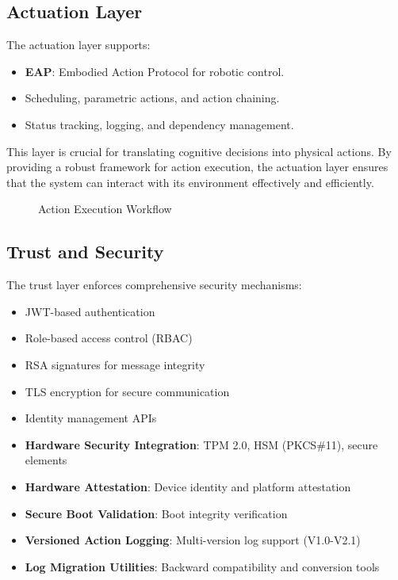 \documentclass[12pt]{article}
\begin{document}
\subsection{Actuation Layer}
The actuation layer supports:
\begin{itemize}
  \item \textbf{EAP}: Embodied Action Protocol for robotic control.
  \item Scheduling, parametric actions, and action chaining.
  \item Status tracking, logging, and dependency management.
\end{itemize}

This layer is crucial for translating cognitive decisions into physical actions. By providing a robust framework for action execution, the actuation layer ensures that the system can interact with its environment effectively and efficiently.

\begin{figure}[H]
\centering
{}
\caption{Action Execution Workflow}
\end{figure}

\subsection{Trust and Security}
The trust layer enforces comprehensive security mechanisms:
\begin{itemize}
  \item JWT-based authentication
  \item Role-based access control (RBAC)
  \item RSA signatures for message integrity
  \item TLS encryption for secure communication
  \item Identity management APIs
  \item \textbf{Hardware Security Integration}: TPM 2.0, HSM (PKCS\#11), secure elements
  \item \textbf{Hardware Attestation}: Device identity and platform attestation
  \item \textbf{Secure Boot Validation}: Boot integrity verification
  \item \textbf{Versioned Action Logging}: Multi-version log support (V1.0-V2.1)
  \item \textbf{Log Migration Utilities}: Backward compatibility and conversion tools
\end{itemize}
\end{document}

